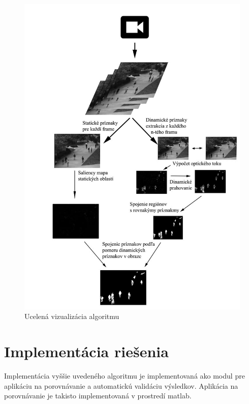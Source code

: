   \begin{figure}[H]
    \centering
    \includegraphics[width=15cm]{pics/workflow.jpg}
    \caption{Ucelená vizualizácia algoritmu}
    \vspace{10mm}
  \end{figure}

\section{Implementácia riešenia}
Implementácia vyššie uvedeného algoritmu je implementovaná ako modul pre aplikáciu na porovnávanie a  automatickú validáciu výsledkov.
Aplikácia na porovnávanie je takisto implementovaná v prostredí matlab.

